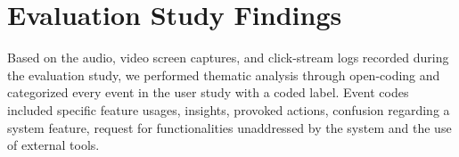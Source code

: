 \section{Evaluation Study Findings\label{sec:eval_findings}}
Based on the audio, video screen captures, and click-stream logs recorded during the evaluation study, we performed thematic analysis through open-coding and categorized every event in the user study with a coded label. Event codes included specific feature usages, insights, provoked actions, confusion regarding a system feature, request for functionalities unaddressed by the system and the use of external tools.
